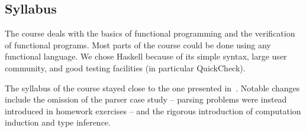 \subsection{Syllabus}

The course deals with the basics of functional programming and the verification of functional programs.
Most parts of the course could be done using any functional language.
We chose Haskell because of its simple syntax, large user community, and good testing facilities (in particular QuickCheck).

The syllabus of the course stayed close to the one presented in~\citep{next_1100}.
Notable changes include the omission of the parser case study -- parsing problems were instead introduced in homework exercises -- and the rigorous introduction of computation induction and type inference.

